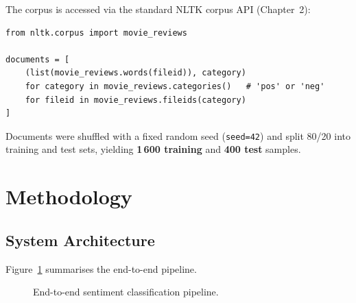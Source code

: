 \documentclass[11pt,a4paper]{article}
\begin{document}
The corpus is accessed via the standard NLTK corpus API (Chapter~2):

\begin{lstlisting}[caption={Corpus access using the NLTK corpus API.}]
from nltk.corpus import movie_reviews

documents = [
    (list(movie_reviews.words(fileid)), category)
    for category in movie_reviews.categories()   # 'pos' or 'neg'
    for fileid in movie_reviews.fileids(category)
]
\end{lstlisting}

Documents were shuffled with a fixed random seed (\texttt{seed=42}) and split 80/20
into training and test sets, yielding \textbf{1\,600 training} and \textbf{400 test}
samples.

\section{Methodology}

\subsection{System Architecture}

Figure~\ref{fig:pipeline} summarises the end-to-end pipeline.

\begin{figure}[H]
  \centering
  \setlength{\fboxsep}{8pt}
  \caption{End-to-end sentiment classification pipeline.}
  \label{fig:pipeline}
\end{figure}
\end{document}

